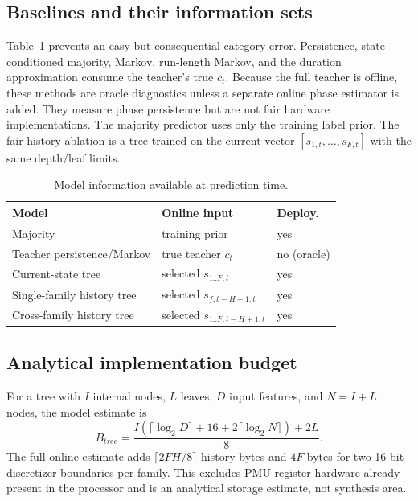 \documentclass[conference,10pt]{IEEEtran}
\begin{document}
\subsection{Baselines and their information sets}

Table~\ref{tab:baselines} prevents an easy but consequential category error. Persistence,
state-conditioned majority, Markov, run-length Markov, and the duration approximation
consume the teacher's true $c_t$. Because the full teacher is offline, these methods
are oracle diagnostics unless a separate online phase estimator is added. They measure
phase persistence but are not fair hardware implementations. The majority predictor
uses only the training label prior. The fair history ablation is a tree trained on the
current vector $[s_{1,t},\ldots,s_{F,t}]$ with the same depth/leaf limits.

\begin{table}[t]
\centering
\caption{Model information available at prediction time.}
\label{tab:baselines}
\footnotesize
\begin{tabular}{p{}p{}p{}}
\toprule
Model & Online input & Deploy. \\
\midrule
Majority & training prior & yes \\
Teacher persistence/Markov & true teacher $c_t$ & no (oracle) \\
Current-state tree & selected $s_{1..F,t}$ & yes \\
Single-family history tree & selected $s_{f,t-H+1:t}$ & yes \\
Cross-family history tree & selected $s_{1..F,t-H+1:t}$ & yes \\
\bottomrule
\end{tabular}
\end{table}

\subsection{Analytical implementation budget}

For a tree with $I$ internal nodes, $L$ leaves, $D$ input features, and $N=I+L$
nodes, the model estimate is
\begin{equation}
 B_{tree}=\frac{I(\lceil\log_2D\rceil+16+2\lceil\log_2N\rceil)+2L}{8}.
\end{equation}
The full online estimate adds $\lceil2FH/8\rceil$ history bytes and $4F$ bytes for two
16-bit discretizer boundaries per family. This excludes PMU register hardware already
present in the processor and is an analytical storage estimate, not synthesis area.
\end{document}

